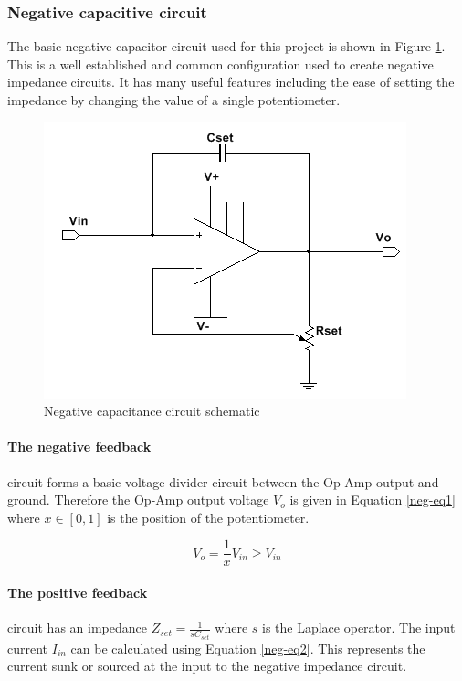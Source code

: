 \subsubsection{Negative capacitive circuit}
The basic negative capacitor circuit used for this project is shown in Figure \ref{neg-fig-1}.  This is a well established and common configuration used to create negative impedance circuits.  It has many useful features including the ease of setting the impedance by changing the value of a single potentiometer.

\begin{figure}
	\begin{center}
		\includegraphics[width=.6\textwidth]{Images/neg-cap-circ.png}
		\caption{Negative capacitance circuit schematic\label{neg-fig-1}}
	\end{center}
\end{figure}

\paragraph{The negative feedback} circuit forms a basic voltage divider circuit between the Op-Amp output and ground.  Therefore the Op-Amp output voltage $V_o$ is given in Equation \ref{neg-eq1} where $x\in[0,1]$ is the position of the potentiometer.

\begin{equation}
	V_o=\frac{1}{x}V_{in}\geq V_{in}\label{neg-eq1}
\end{equation}

\paragraph{The positive feedback} circuit has an impedance $Z_{set}=\frac{1}{sC_{set}}$ where $s$ is the Laplace operator.  The input current $I_{in}$ can be calculated using Equation \ref{neg-eq2}.  This represents the current sunk or sourced at the input to the negative impedance circuit.


